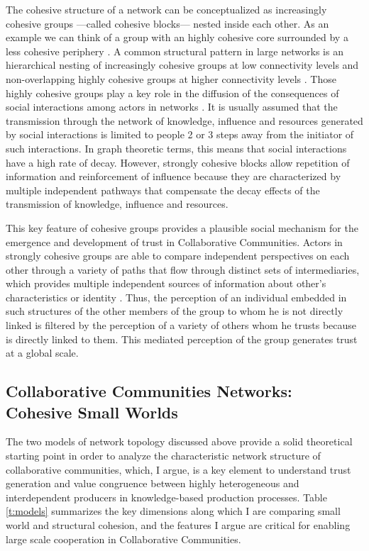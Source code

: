 The cohesive structure of a network can be conceptualized as increasingly cohesive groups ---called cohesive blocks--- nested inside each other. As an example we can think of a group with an highly cohesive core surrounded by a less cohesive periphery \citep{borgatti:2000}. A common structural pattern in large networks is an hierarchical nesting of increasingly cohesive groups at low connectivity levels and non-overlapping highly cohesive groups at higher connectivity levels \citep[112]{moody:2003}. Those highly cohesive groups play a key role in the diffusion of the consequences of social interactions among actors in networks \citep[355-356]{white:2001}. It is usually assumed that the transmission through the network of knowledge, influence and resources generated by social interactions is limited to people 2 or 3 steps away from the initiator of such interactions. In graph theoretic terms, this means that social interactions have a high rate of decay. However, strongly cohesive blocks allow repetition of information and reinforcement of influence because they are characterized by multiple independent pathways that compensate the decay effects of the transmission of knowledge, influence and resources.

This key feature of cohesive groups provides a plausible social mechanism for the emergence and development of trust in Collaborative Communities. Actors in strongly cohesive groups are able to compare independent perspectives on each other through a variety of paths that flow through distinct sets of intermediaries, which provides multiple independent sources of information about other's characteristics or identity \citep[320]{white:2001}. Thus, the perception of an individual embedded in such structures of the other members of the group to whom he is not directly linked is filtered by the perception of a variety of others whom he trusts because is directly linked to them. This mediated perception of the group generates trust at a global scale.

\subsection{Collaborative Communities Networks: Cohesive Small Worlds}

The two models of network topology discussed above provide a solid theoretical starting point in order to analyze the characteristic network structure of collaborative communities, which, I argue, is a key element to understand trust generation and value congruence between highly heterogeneous and interdependent producers in knowledge-based production processes. Table \ref{t:models} summarizes the key dimensions along which I are comparing small world and structural cohesion, and the features I argue are critical for enabling large scale cooperation in Collaborative Communities.

